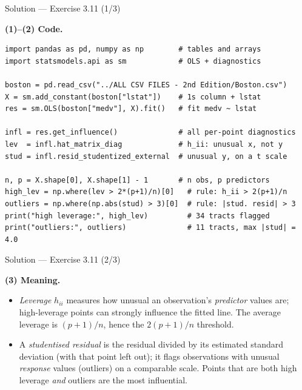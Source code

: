 \documentclass[aspectratio=169,11pt]{beamer}
\begin{document}
\begin{frame}[fragile]{Solution --- Exercise 3.11 (1/3)}
  \begin{solutionbox}
    \textbf{(1)--(2) Code.}
    \vspace{-2mm}
\begin{lstlisting}
import pandas as pd, numpy as np        # tables and arrays
import statsmodels.api as sm            # OLS + diagnostics

boston = pd.read_csv("../ALL CSV FILES - 2nd Edition/Boston.csv")
X = sm.add_constant(boston["lstat"])    # 1s column + lstat
res = sm.OLS(boston["medv"], X).fit()   # fit medv ~ lstat

infl = res.get_influence()              # all per-point diagnostics
lev  = infl.hat_matrix_diag             # h_ii: unusual x, not y
stud = infl.resid_studentized_external  # unusual y, on a t scale

n, p = X.shape[0], X.shape[1] - 1       # n obs, p predictors
high_lev = np.where(lev > 2*(p+1)/n)[0]   # rule: h_ii > 2(p+1)/n
outliers = np.where(np.abs(stud) > 3)[0]  # rule: |stud. resid| > 3
print("high leverage:", high_lev)         # 34 tracts flagged
print("outliers:", outliers)              # 11 tracts, max |stud| = 4.0
\end{lstlisting}
  \end{solutionbox}
\end{frame}

\begin{frame}{Solution --- Exercise 3.11 (2/3)}
  \begin{solutionbox}
    \textbf{(3) Meaning.}
    \begin{itemize}
      \item \emph{Leverage} $h_{ii}$ measures how unusual an
            observation's \emph{predictor} values are; high-leverage
            points can strongly influence the fitted line. The average
            leverage is $(p+1)/n$, hence the $2(p+1)/n$ threshold.
      \item A \emph{studentised residual} is the residual divided by its
            estimated standard deviation (with that point left out); it
            flags observations with unusual \emph{response} values
            (outliers) on a comparable scale. Points that are both high
            leverage \emph{and} outliers are the most influential.
    \end{itemize}
  \end{solutionbox}
\end{frame}
\end{document}
